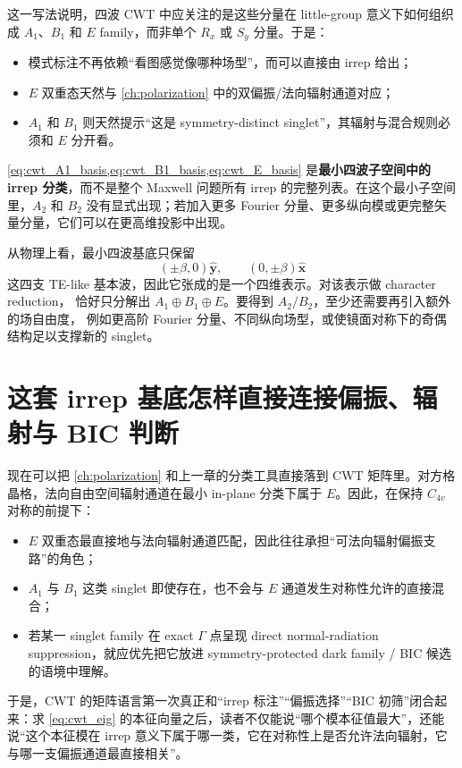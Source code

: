 这一写法说明，四波 CWT 中应关注的是这些分量在 little-group 意义下如何组织成 $A_1$、$B_1$ 和 $E$ family，而非单个 $R_x$ 或 $S_y$ 分量。于是：
\begin{itemize}
  \item 模式标注不再依赖“看图感觉像哪种场型”，而可以直接由 irrep 给出；
  \item $E$ 双重态天然与 \cref{ch:polarization} 中的双偏振/法向辐射通道对应；
  \item $A_1$ 和 $B_1$ 则天然提示“这是 symmetry-distinct singlet”，其辐射与混合规则必须和 $E$ 分开看。
\end{itemize}

\cref{eq:cwt_A1_basis,eq:cwt_B1_basis,eq:cwt_E_basis} 是\textbf{最小四波子空间中的 irrep 分类}，而不是整个 Maxwell 问题所有 irrep 的完整列表。在这个最小子空间里，$A_2$ 和 $B_2$ 没有显式出现；若加入更多 Fourier 分量、更多纵向模或更完整矢量分量，它们可以在更高维投影中出现。

从物理上看，最小四波基底只保留
\[
(\pm\beta,0)\hat{\bm y},\qquad (0,\pm\beta)\hat{\bm x}
\]
这四支 TE-like 基本波，因此它张成的是一个四维表示。对该表示做 character reduction，
恰好只分解出 $A_1\oplus B_1\oplus E$。要得到 $A_2/B_2$，至少还需要再引入额外的场自由度，
例如更高阶 Fourier 分量、不同纵向场型，或使镜面对称下的奇偶结构足以支撑新的 singlet。

\section{这套 irrep 基底怎样直接连接偏振、辐射与 BIC 判断}
现在可以把 \cref{ch:polarization} 和上一章的分类工具直接落到 CWT 矩阵里。对方格晶格，法向自由空间辐射通道在最小 in-plane 分类下属于 $E$。因此，在保持 $C_{4v}$ 对称的前提下：
\begin{itemize}
  \item $E$ 双重态最直接地与法向辐射通道匹配，因此往往承担“可法向辐射偏振支路”的角色；
  \item $A_1$ 与 $B_1$ 这类 singlet 即使存在，也不会与 $E$ 通道发生对称性允许的直接混合；
  \item 若某一 singlet family 在 exact $\Gamma$ 点呈现 direct normal-radiation suppression，就应优先把它放进 symmetry-protected dark family / BIC 候选的语境中理解。
\end{itemize}

于是，CWT 的矩阵语言第一次真正和“irrep 标注”“偏振选择”“BIC 初筛”闭合起来：求 \cref{eq:cwt_eig} 的本征向量之后，读者不仅能说“哪个模本征值最大”，还能说“这个本征模在 irrep 意义下属于哪一类，它在对称性上是否允许法向辐射，它与哪一支偏振通道最直接相关”。

